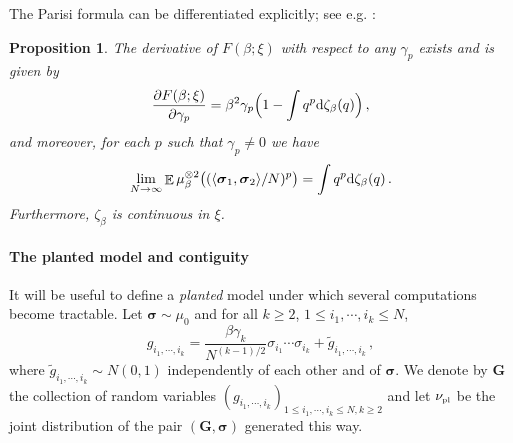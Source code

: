 \documentclass[11pt]{article}
\newtheorem{proposition}[theorem]{Proposition}
\theoremstyle{definition}
\numberwithin{equation}{section}
\newcommand{\<}{\langle}
\renewcommand{\>}{\rangle}
\def\bsigma{{\boldsymbol{\sigma}}}
\def\bbE{{\mathbb{E}}}
\def\pl{\mbox{\rm\tiny pl}}
\def\de{{\rm d}}
\def\bG{{\boldsymbol G}}
\DeclareMathOperator*{\E}{\bbE}
\begin{document}
The Parisi formula can be differentiated explicitly; see e.g. \cite{talagrand2006parisi,panchenko2008differentiability}:

\begin{proposition}
\label{prop:free-energy-deriv}
The derivative of $F(\beta;\xi)$ with respect to any $\gamma_p$ exists and is given by
\[
\frac{\partial F(\beta;\xi)}{\partial\gamma_p}
=
\beta^2 \gamma_p 
\Big(1-\int q^p  \de \zeta_{\beta}(q)\Big)\,,
\]
and moreover, for each $p$ such that $\gamma_p \neq 0$ we have
\[ \lim_{N \to \infty} \E \mu_{\beta}^{\otimes 2} \big( (\langle \bsigma_1 , \bsigma_2 \rangle/N)^p \big) = \int q^p  \de \zeta_{\beta}(q)\,.\]
Furthermore, $\zeta_{\beta}$ is continuous in $\xi$.
\end{proposition}


\paragraph{The planted model and contiguity} It will be useful to define a \emph{planted} model under which several computations become tractable. Let $\bsigma \sim \mu_0$ and for all $k \ge 2$, $1 \le i_1,\cdots,i_k \le N$,
\begin{equation}\label{eq:pl}
g_{i_1,\cdots,i_k} = \frac{\beta \gamma_k}{N^{(k-1)/2}} \sigma_{i_1}\cdots \sigma_{i_k} + \tilde{g}_{i_1,\cdots,i_k}\,, 
\end{equation}
where $\tilde{g}_{i_1,\cdots,i_k} \sim N(0,1)$ independently of each other and of $\bsigma$. We denote by $\bG$ the collection of random variables $(g_{i_1,\cdots,i_k})_{1 \le i_1,\cdots, i_k \le N, k \ge 2}$ and let $\nu_{\pl}$ be the joint distribution of the pair $(\bG,\bsigma)$ generated this way. 
\end{document}
